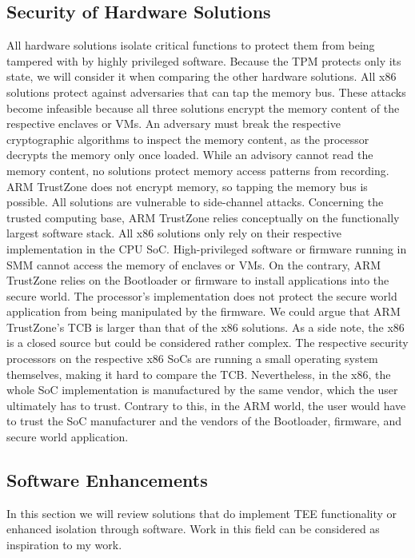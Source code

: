 \subsection{Security of Hardware Solutions}
All hardware solutions isolate critical functions to protect them from being tampered with by highly
privileged software. Because the TPM protects only its state, we will consider it when comparing the other hardware
solutions. All x86 solutions protect against adversaries that can tap the memory bus. These attacks become infeasible
because all three solutions encrypt the memory content of the respective enclaves or VMs. An adversary must break the
respective cryptographic algorithms to inspect the memory content, as the processor decrypts the memory only once
loaded. While an advisory cannot read the memory content, no solutions protect memory access patterns from recording.
ARM TrustZone does not encrypt memory, so tapping the memory bus is possible. All solutions are vulnerable to
side-channel attacks. Concerning the trusted computing base, ARM TrustZone relies conceptually on the functionally
largest software stack. All x86 solutions only rely on their respective implementation in the CPU SoC. High-privileged
software or firmware running in SMM cannot access the memory of enclaves or VMs. On the contrary, ARM TrustZone
relies on the Bootloader or firmware to install applications into the secure world. The processor's implementation does
not protect the secure world application from being manipulated by the firmware. We could argue that ARM TrustZone's TCB
is larger than that of the x86 solutions. As a side note, the x86 is a closed source but could be considered rather
complex. The respective security processors on the respective x86 SoCs are running a small operating system themselves,
making it hard to compare the TCB. Nevertheless, in the x86, the whole SoC implementation is manufactured by the same
vendor, which the user ultimately has to trust. Contrary to this, in the ARM world, the user would have to trust the
SoC manufacturer and the vendors of the Bootloader, firmware, and secure world application.

\subsection{Software Enhancements}
In this section we will review solutions that do implement TEE functionality or enhanced isolation through software.
Work in this field can be considered as inspiration to my work.

